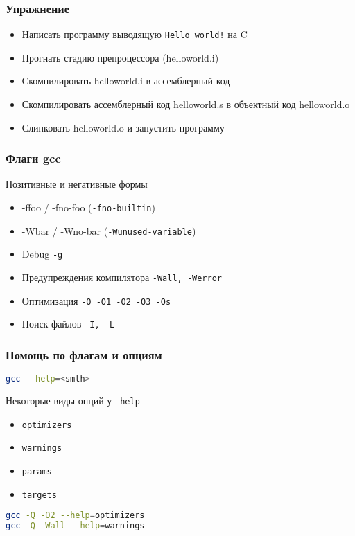 \begin{frame}
\frametitle{Упражнение}
\begin{itemize}
  \item Написать программу выводящую {\tt Hello world!} на C
  \item Прогнать стадию препроцессора (helloworld.i)
  \item Скомпилировать helloworld.i в ассемблерный код
  \item Скомпилировать ассемблерный код helloworld.s в объектный код helloworld.o
  \item Слинковать helloworld.o и запустить программу
\end{itemize}
\end{frame}


\begin{frame}
\frametitle{Флаги gcc}

	\begin{block}{Позитивные и негативные формы}
		\begin{itemize}
			\item -ffoo / -fno-foo ({\tt -fno-builtin})
			\item -Wbar / -Wno-bar ({\tt -Wunused-variable})
		\end{itemize}
	\end{block}


	\begin{itemize}
	  \item Debug {\tt -g}
	  \item Предупреждения компилятора {\tt -Wall, -Werror}
	  \item Оптимизация {\tt -O -O1 -O2 -O3 -Os}
      \item Поиск файлов {\tt -I, -L}
	\end{itemize}
\end{frame}

\begin{frame}[fragile]
  \frametitle{Помощь по флагам и опциям}
\begin{lstlisting}[language=sh]
gcc --help=<smth>
\end{lstlisting}
\begin{block}{Некоторые виды опций у \texttt{--help}}
  \begin{itemize}
    \item \texttt{optimizers}
    \item \texttt{warnings}
    \item \texttt{params}
    \item \texttt{targets}
  \end{itemize}
\end{block}
\begin{lstlisting}[language=sh]
gcc -Q -O2 --help=optimizers
gcc -Q -Wall --help=warnings
\end{lstlisting}
\end{frame}

